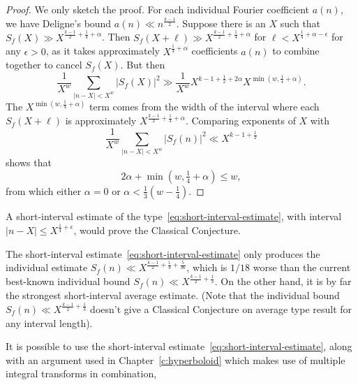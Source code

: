 \begin{proof}
  We only sketch the proof.
  For each individual Fourier coefficient $a(n)$, we have Deligne's bound $a(n) \ll
  n^{\frac{k-1}{2}}$.
  Suppose there is an $X$ such that $S_f(X) \gg X^{\frac{k-1}{2} + \frac{1}{4} + \alpha}$.
  Then $S_f(X + \ell) \gg X^{\frac{k-1}{2} + \frac{1}{4} + \alpha}$ for $\ell <
  X^{\frac{1}{4} + \alpha - \epsilon}$ for any $\epsilon > 0$, as it takes approximately
  $X^{\frac{1}{4} + \alpha}$ coefficients $a(n)$ to combine together to cancel $S_f(X)$.
  But then
  \begin{equation}
    \frac{1}{X^w} \sum_{\lvert n - X \rvert < X^w} \lvert S_f(X) \rvert^2 \gg
    \frac{1}{X^w} X^{k-1 + \frac{1}{2} + 2\alpha} X^{\min(w, \frac{1}{4} + \alpha)}.
  \end{equation}
  The $X^{\min(w, \frac{1}{4} + \alpha)}$ term comes from the width of the interval where
  each $S_f(X + \ell)$ is approximately $X^{\frac{k-1}{2} + \frac{1}{4} + \alpha}$.
  Comparing exponents of $X$ with
  \begin{equation}
    \frac{1}{X^w} \sum_{\lvert n - X \rvert < X^w} \lvert S_f(n) \rvert^2 \ll X^{k - 1 +
    \frac{1}{2}}
  \end{equation}
  shows that
  \begin{equation}
    2\alpha + \min(w, \tfrac{1}{4} + \alpha) \leq w,
  \end{equation}
  from which either $\alpha = 0$ or $\alpha < \tfrac{1}{3}( w - \tfrac{1}{4})$.
\end{proof}


\begin{corollary}
  A short-interval estimate of the type~\eqref{eq:short-interval-estimate}, with interval
  $\lvert n-X \rvert \leq X^{\frac{1}{4} + \epsilon}$, would prove the Classical
  Conjecture.
\end{corollary}

The short-interval estimate~\eqref{eq:short-interval-estimate} only produces the
individual estimate $S_f(n) \ll X^{\frac{k-1}{2} + \frac{1}{4} + \frac{5}{36}}$, which is
$1/18$ worse than the current best-known individual bound $S_f(n) \ll X^{\frac{k-1}{2} +
\frac{1}{3}}$.
On the other hand, it is by far the strongest short-interval average estimate.
(Note that the individual bound $S_f(n) \ll X^{\frac{k-1}{2} + \frac{1}{3}}$ doesn't give
a Classical Conjecture on average type result for any interval length).


\begin{remark}
  It is possible to use the short-interval estimate~\eqref{eq:short-interval-estimate},
  along with an argument used in Chapter~\ref{c:hyperboloid} which makes use of multiple
  integral transforms in combination,
\end{remark}


